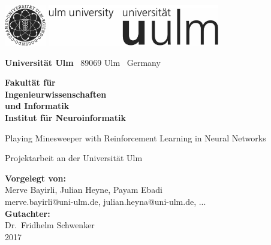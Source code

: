 \documentclass[
    a4paper,
    10pt,
    bibliography=totoc,
    twoside,
    openright,
    numbers=noenddot,
    headings=normal,
    DIV=9,
    parskip
]{scrbook}
\makeatletter
\newcommand{\fullname}{Merve Bayirli, Julian Heyne, Payam Ebadi}
\newcommand{\email}{merve.bayirli@uni-ulm.de, julian.heyna@uni-ulm.de, ...}
\newcommand{\titel}{Playing Minesweeper with
Reinforcement Learning in Neural Networks}
\newcommand{\jahr}{2017}
\newcommand{\gutachterA}{Dr.\ Fridhelm Schwenker}
\newcommand{\fakultaet}{Ingenieurwissenschaften\\und Informatik}
\newcommand{\institut}{Institut für Neuroinformatik}
\newcommand{\arbeit}{Projektarbeit}
\makeatother
\begin{document}
\frontmatter


\thispagestyle{empty}
\begin{addmargin*}[4mm]{-32mm}
    \includegraphics[height=1.8cm]{images/unilogo_bild}
    \hfill
    \includegraphics[height=1.8cm]{images/unilogo_wort}
    \vspace*{2.1em}

    \footnotesize
    \textbf{Universität Ulm} \textbar ~89069 Ulm \textbar ~Germany
    \hfill
    \parbox[t]{42mm}{\bfseries Fakultät für\\\fakultaet\\\mdseries\institut}
    \vspace*{2cm}

    \parbox{140mm}{\bfseries \raggedright \huge \titel}

    {\arbeit{} an der Universität Ulm}
    \vspace*{4em}

    \textbf{Vorgelegt von:}\\\fullname\\\email\\[2em]
    \textbf{Gutachter:}\\\gutachterA\\[2em]
    \jahr
\end{addmargin*}
\end{document}
